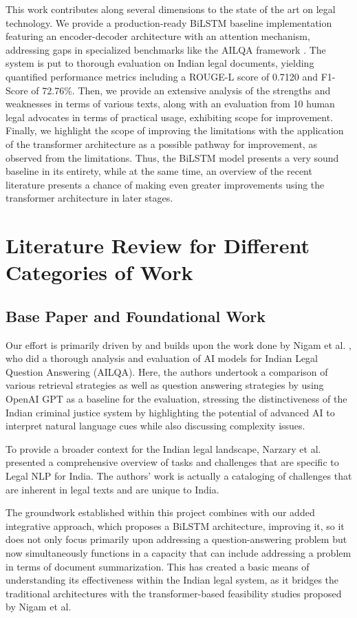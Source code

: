 \documentclass[conference]{IEEEtran}
\begin{document}
This work contributes along several dimensions to the state of the art on legal technology. We provide a production-ready BiLSTM baseline implementation featuring an encoder-decoder architecture with an attention mechanism, addressing gaps in specialized benchmarks like the AILQA framework \cite{ailqa2024}. The system is put to thorough evaluation on Indian legal documents, yielding quantified performance metrics including a ROUGE-L score of 0.7120 and F1-Score of 72.76\%. Then, we provide an extensive analysis of the strengths and weaknesses in terms of various texts, along with an evaluation from 10 human legal advocates in terms of practical usage, exhibiting scope for improvement. Finally, we highlight the scope of improving the limitations with the application of the transformer architecture as a possible pathway for improvement, as observed from the limitations. Thus, the BiLSTM model presents a very sound baseline in its entirety, while at the same time, an overview of the recent literature presents a chance of making even greater improvements using the transformer architecture in later stages.

\section{Literature Review for Different Categories of Work}

\subsection{Base Paper and Foundational Work}
Our effort is primarily driven by and builds upon the work done by Nigam et al. \cite{nigam2023legal}, who did a thorough analysis and evaluation of AI models for Indian Legal Question Answering (AILQA). Here, the authors undertook a comparison of various retrieval strategies as well as question answering strategies by using OpenAI GPT as a baseline for the evaluation, stressing the distinctiveness of the Indian criminal justice system by highlighting the potential of advanced AI to interpret natural language cues while also discussing complexity issues.

To provide a broader context for the Indian legal landscape, Narzary et al. \cite{narzary2025survey} presented a comprehensive overview of tasks and challenges that are specific to Legal NLP for India. The authors' work is actually a cataloging of challenges that are inherent in legal texts and are unique to India.

The groundwork established within this project combines with our added integrative approach, which proposes a BiLSTM architecture, improving it, so it does not only focus primarily upon addressing a question-answering problem but now simultaneously functions in a capacity that can include addressing a problem in terms of document summarization. This has created a basic means of understanding its effectiveness within the Indian legal system, as it bridges the traditional architectures with the transformer-based feasibility studies proposed by Nigam et al.
\end{document}
